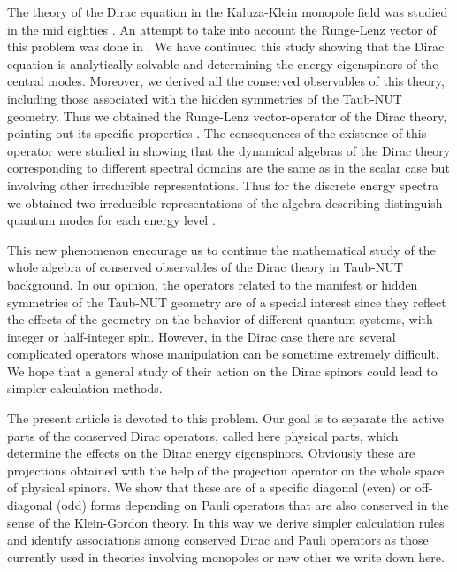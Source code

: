 \documentclass[a4paper,12pt]{article}
\begin{document}
The theory of the Dirac equation in the Kaluza-Klein monopole field was 
studied in the mid eighties \cite{DIRAC}. An attempt to take into account 
the Runge-Lenz vector of this problem was done in \cite{CH}. We have 
continued this study showing that the Dirac equation is analytically 
solvable \cite{CV2} and determining the energy eigenspinors of the 
central modes. Moreover, we derived all the conserved observables of 
this theory, including those associated with the hidden symmetries of 
the Taub-NUT geometry. Thus we obtained the Runge-Lenz vector-operator 
of the Dirac theory, pointing out its specific properties \cite{CV3}. 
The consequences of the existence of this  operator were studied 
in \cite{CV4} showing that the dynamical algebras of the Dirac theory 
corresponding to different spectral domains are the same as in the scalar 
case \cite{GRFH} but involving  other irreducible representations. Thus 
for the discrete energy spectra we  obtained two irreducible 
representations of the \coordHE{} algebra describing distinguish quantum 
modes for each energy level \cite{CV4}. 

This new phenomenon encourage us to continue the mathematical study 
of the whole algebra of conserved observables of the Dirac theory in 
Taub-NUT background. In our opinion, the  operators related to the 
manifest or hidden symmetries of the Taub-NUT geometry  are of a special 
interest since they reflect the effects of the geometry on the behavior 
of different quantum systems, with integer or half-integer spin. However, 
in the Dirac case there are several complicated operators whose  
manipulation can be  sometime  extremely difficult. We hope that a general 
study of their action on the Dirac spinors could lead to simpler 
calculation methods.    
     
The present article is devoted to this problem. Our goal is to separate the 
active parts of the conserved Dirac operators, called here physical parts, 
which determine the effects on the Dirac energy eigenspinors. Obviously 
these are projections obtained with the help of the projection operator on 
the whole space of physical spinors. We show that these are of a specific 
diagonal (even) or off-diagonal (odd) forms depending on Pauli operators 
that are also conserved in the sense of the Klein-Gordon theory. In this 
way we derive  simpler calculation rules and  identify associations among  
conserved Dirac and  Pauli operators as those currently used in theories 
involving monopoles \cite{DYON,JMP,HMH} or new other we write down here. 
\end{document}
